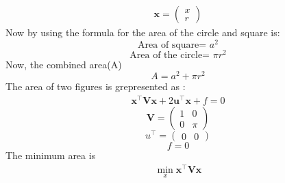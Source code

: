 \documentclass[journal,12pt,twocolumn]{IEEEtran}
\let\vec\mathbf
\newcommand{\myvec}[1]{\ensuremath{\begin{pmatrix}#1\end{pmatrix}}}
\begin{document}
\begin{align}
\vec{x}  = \myvec{x\\r}
\end{align}
Now by using the formula for the area of the circle and square is:
\begin{equation}
\text{Area of square= }a^2
\end{equation}
\begin{equation}
\text{Area of the circle= }\pi r^2
\end{equation}
Now, the combined area(A) 
\begin{equation}
A=a^2+\pi r^2
\end{equation}
The area of two figures is grepresented as :
\begin{align}
\vec{x}^{\top}\vec{V}\vec{x}+2\vec{u}^{\top}\vec{x}+f=0
\end{align}
\begin{equation}
\vec{V} = \begin{pmatrix}
1 & 0 \\
0 & \pi
\end{pmatrix}
\end{equation}
\begin{equation}
u^\top = \begin{pmatrix}
0 & 0
\end{pmatrix}
\end{equation}
\begin{equation}
f = 0
\end{equation}
\noindent The minimum area is 
\begin{align}
\min_{x} \vec{x}^{\top}\vec{V}\vec{x} 
\end{align}
\end{document}

